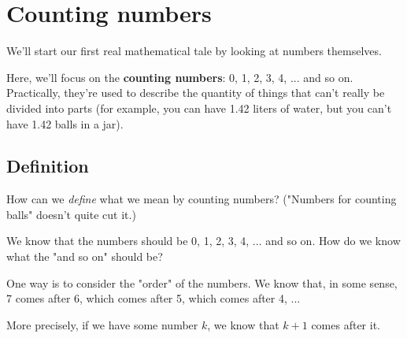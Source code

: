 


\section{Counting numbers}

We'll start our first real mathematical tale by looking at numbers themselves. 

Here, we'll focus on the \textbf{counting numbers}: 0, 1, 2, 3, 4, ... and so on. Practically, they're used to describe the quantity of things that can't really be divided into parts (for example, you can have 1.42 liters of water, but you can't have 1.42 balls in a jar). 

\subsection{Definition}

How can we \emph{define} what we mean by counting numbers? ("Numbers for counting balls" doesn't quite cut it.)

We know that the numbers should be 0, 1, 2, 3, 4, ... and so on. How do we know what the "and so on" should be?

One way is to consider the "order" of the numbers. We know that, in some sense, 7 comes after 6, which comes after 5, which comes after 4, ... 

More precisely, if we have some number $k$, we know that $k+1$ comes after it. 

